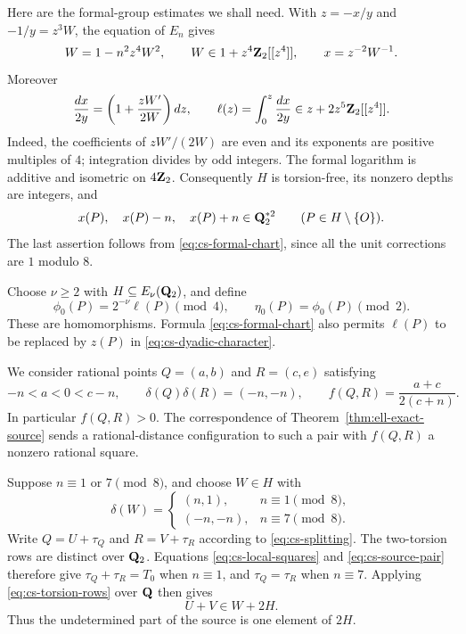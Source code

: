 Here are the formal-group estimates we shall need.  With $z=-x/y$ and
$-1/y=z^3W$, the equation of $E_n$ gives
\begin{equation}\label{eq:cs-formal-chart}
 W=1-n^2z^4W^2,\qquad
 W\in1+z^4\mathbf Z_2[[z^4]],\qquad x=z^{-2}W^{-1}.
\end{equation}
Moreover
\[
 \frac{dx}{2y}=
 \left(1+\frac{zW'}{2W}\right)dz,
 \qquad
 \ell(z)=\int_0^z\frac{dx}{2y}
       \in z+2z^5\mathbf Z_2[[z^4]].
\]
Indeed, the coefficients of $zW'/(2W)$ are even and its exponents are
positive multiples of $4$; integration divides by odd integers.  The
formal logarithm is additive and isometric on $4\mathbf Z_2$.  Consequently
$H$ is torsion-free, its nonzero depths are integers, and
\begin{equation}\label{eq:cs-local-squares}
 x(P),\quad x(P)-n,\quad x(P)+n\in\mathbf Q_2^{*2}\qquad(P\in H\setminus\{O\}).
\end{equation}
The last assertion follows from \eqref{eq:cs-formal-chart}, since all the
unit corrections are $1$ modulo $8$.

Choose $\nu\geq2$ with $H\subseteq E_\nu(\mathbf Q_2)$, and define
\begin{equation}\label{eq:cs-dyadic-character}
 \phi_0(P)=2^{-\nu}\ell(P)\pmod4,
 \qquad \eta_0(P)=\phi_0(P)\pmod2.
\end{equation}
These are homomorphisms.  Formula \eqref{eq:cs-formal-chart} also permits
$\ell(P)$ to be replaced by $z(P)$ in \eqref{eq:cs-dyadic-character}.

We consider rational points $Q=(a,b)$ and $R=(c,e)$ satisfying
\begin{equation}\label{eq:cs-source-pair}
 -n<a<0<c-n,\qquad
 \delta(Q)\delta(R)=(-n,-n),\qquad
 f(Q,R)=\frac{a+c}{2(c+n)}.
\end{equation}
In particular $f(Q,R)>0$.  The correspondence of
Theorem~\ref{thm:ell-exact-source} sends a rational-distance configuration
to such a pair with $f(Q,R)$ a nonzero rational square.

Suppose $n\equiv1$ or $7\pmod8$, and choose $W\in H$ with
\begin{equation}\label{eq:cs-source-row}
 \delta(W)=
 \begin{cases}(n,1),&n\equiv1\pmod8,\\
 (-n,-n),&n\equiv7\pmod8.
 \end{cases}
\end{equation}
Write $Q=U+\tau_Q$ and $R=V+\tau_R$ according to
\eqref{eq:cs-splitting}.  The two-torsion rows are distinct over $\mathbf Q_2$.
Equations \eqref{eq:cs-local-squares} and \eqref{eq:cs-source-pair} therefore
give $\tau_Q+\tau_R=T_0$ when $n\equiv1$, and $\tau_Q=\tau_R$ when
$n\equiv7$.  Applying \eqref{eq:cs-torsion-rows} over $\mathbf Q$ then gives
\begin{equation}\label{eq:cs-complete-coset}
 U+V\in W+2H.
\end{equation}
Thus the undetermined part of the source is one element of $2H$.

